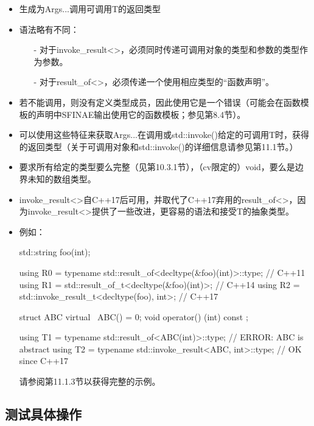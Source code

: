 \begin{itemize}
\item 
生成为Args...调用可调用T的返回类型

\item 
语法略有不同：

\begin{itemize}
\item [-]
对于invoke\_result<>，必须同时传递可调用对象的类型和参数的类型作为参数。

\item [-]
对于result\_of<>，必须传递一个使用相应类型的“函数声明”。
\end{itemize}

\item 
若不能调用，则没有定义类型成员，因此使用它是一个错误（可能会在函数模板的声明中SFINAE输出使用它的函数模板；参见第8.4节）。

\item 
可以使用这些特征来获取Args...在调用或std::invoke()给定的可调用T时，获得的返回类型（关于可调用对象和std::invoke()的详细信息请参见第11.1节。）

\item 
要求所有给定的类型要么完整（见第10.3.1节），（cv限定的）void，要么是边界未知的数组类型。

\item 
invoke\_result<>自C++17后可用，并取代了C++17弃用的result\_of<>，因为invoke\_result<>提供了一些改进，更容易的语法和接受T的抽象类型。

\item 
例如：
\begin{cpp}
std::string foo(int);

using R0 = typename std::result_of<decltype(&foo)(int)>::type; // C++11
using R1 = std::result_of_t<decltype(&foo)(int)>; // C++14
using R2 = std::invoke_result_t<decltype(foo), int>; // C++17

struct ABC {
	virtual ~ABC() = 0;
	void operator() (int) const {
	}
};

using T1 = typename std::result_of<ABC(int)>::type; // ERROR: ABC is abstract
using T2 = typename std::invoke_result<ABC, int>::type; // OK since C++17
\end{cpp}

请参阅第11.1.3节以获得完整的示例。

\end{itemize}

\newpage

\subsection{测试具体操作}


